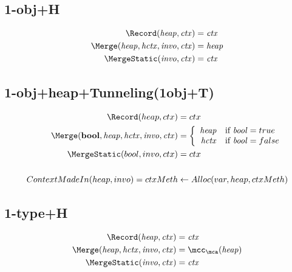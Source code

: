 \subsection{1-obj+H}

\begin{align*}
\Record ({\it heap}, {\it ctx}) &= {\it ctx}\\
\Merge ({\it heap, hctx, invo, ctx}) &= {\it heap} \\
\MergeStatic ({\it invo}, {\it ctx})&={\it ctx}\\
\end{align*}


\subsection{1-obj+heap+Tunneling(1obj+T)}
\begin{align*}
\Record (heap, ctx) &= ctx\\
\Merge ({\it \textbf{bool}, heap, hctx, invo, ctx}) &= \left\{
\begin{array}{rl}
{\it heap} & \mbox{if}~{\it bool} = true \\
{\it hctx} & \mbox{if}~{\it bool} = false
\end{array}
\right.\\
\MergeStatic (bool, invo, ctx)&=ctx\\\\
ContextMadeIn (heap ,invo)=ctxMeth&\leftarrow Alloc(var, heap, ctxMeth)\\
\end{align*}


\subsection{1-type+H}

\begin{align*}
\Record ({\it heap}, {\it ctx}) &= {\it ctx}\\
\Merge ({\it heap, hctx, invo, ctx}) &= {\it \mcc_{\mca}(heap)} \\
\MergeStatic ({\it invo}, {\it ctx})&={\it ctx}\\
\end{align*}

